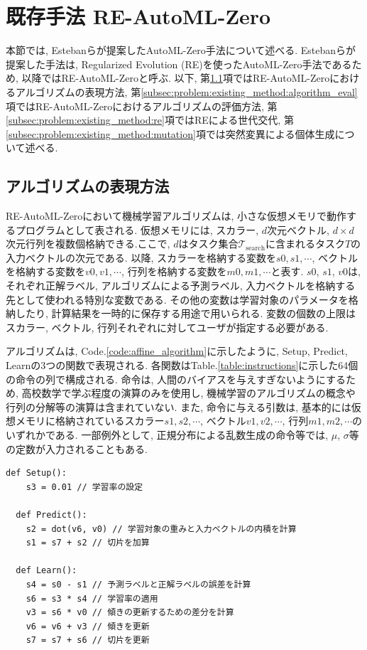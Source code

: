 \documentclass[11pt,oneside,openany,report]{jsbook}
\begin{document}
\section{既存手法 RE-AutoML-Zero}\label{sec:problem:re_automl_zero}

本節では, Estebanらが提案したAutoML-Zero手法について述べる. Estebanらが提案した手法は, Regularized Evolution (RE)を使ったAutoML-Zero手法であるため, 以降ではRE-AutoML-Zeroと呼ぶ. 以下, 第\ref{subsec:problem:existing_method:algorithm_exp}項ではRE-AutoML-Zeroにおけるアルゴリズムの表現方法, 第\ref{subsec:problem:existing_method:algorithm_eval}項ではRE-AutoML-Zeroにおけるアルゴリズムの評価方法, 第\ref{subsec:problem:existing_method:re}項ではREによる世代交代, 第\ref{subsec:problem:existing_method:mutation}項では突然変異による個体生成について述べる.

\subsection{アルゴリズムの表現方法}\label{subsec:problem:existing_method:algorithm_exp}

RE-AutoML-Zeroにおいて機械学習アルゴリズムは, 小さな仮想メモリで動作するプログラムとして表される. 仮想メモリには, スカラー, $d$次元ベクトル, $d \times d$次元行列を複数個格納できる.ここで, $d $はタスク集合$\mathcal{T}_\mathrm{search}$に含まれるタスク$T$の入力ベクトルの次元である. 以降, スカラーを格納する変数を$s0,s1,\cdots$, ベクトルを格納する変数を$v0,v1,\cdots$, 行列を格納する変数を$m0,m1,\cdots$と表す. $s0$, $s1$, $v0$は, それぞれ正解ラベル, アルゴリズムによる予測ラベル, 入力ベクトルを格納する先として使われる特別な変数である. その他の変数は学習対象のパラメータを格納したり, 計算結果を一時的に保存する用途で用いられる. 変数の個数の上限はスカラー, ベクトル, 行列それぞれに対してユーザが指定する必要がある.

アルゴリズムは, Code.\ref{code:affine_algorithm}に示したように, Setup, Predict, Learnの3つの関数で表現される. 各関数はTable.\ref{table:instructions}に示した64個の命令の列で構成される. 命令は, 人間のバイアスを与えすぎないようにするため, 高校数学で学ぶ程度の演算のみを使用し, 機械学習のアルゴリズムの概念や行列の分解等の演算は含まれていない. また, 命令に与える引数は, 基本的には仮想メモリに格納されているスカラー$s1,s2,\cdots$, ベクトル$v1,v2,\cdots$, 行列$m1,m2,\cdots$のいずれかである. 一部例外として, 正規分布による乱数生成の命令等では, $\mu$, $\sigma$等の定数が入力されることもある.

\begin{lstlisting}[caption=アフィン回帰と解釈可能なアルゴリズム,label=code:affine_algorithm]
  def Setup():
    s3 = 0.01 // 学習率の設定

  def Predict():
    s2 = dot(v6, v0) // 学習対象の重みと入力ベクトルの内積を計算
    s1 = s7 + s2 // 切片を加算

  def Learn():
    s4 = s0 - s1 // 予測ラベルと正解ラベルの誤差を計算
    s6 = s3 * s4 // 学習率の適用
    v3 = s6 * v0 // 傾きの更新するための差分を計算
    v6 = v6 + v3 // 傾きを更新
    s7 = s7 + s6 // 切片を更新
\end{lstlisting}
\end{document}
